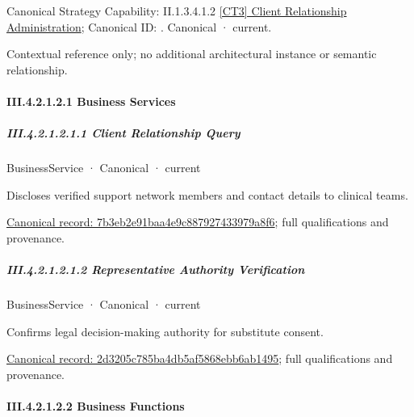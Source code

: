 {\small Canonical Strategy Capability: II.1.3.4.1.2 \hyperref[element:d682c11d3eb04770b1f20be478fd475e]{[CT3] Client Relationship Administration}; Canonical ID: \texttt{}. Canonical · current.}\par
Contextual reference only; no additional architectural instance or semantic relationship.\par
\paragraph*{III.4.2.1.2.1 Business Services}
\label{navigation:III.4.2.1.2.1}

\subparagraph*{III.4.2.1.2.1.1 Client Relationship Query}
\label{navigation:III.4.2.1.2.1.1}

\label{element:7b3eb2e91baa4e9c887927433979a8f6}
{\small BusinessService · Canonical · current}\par

Discloses verified support network members and contact details to clinical teams.


{\footnotesize \href{../../../../continuum/business/business-service/7b3eb2e91baa4e9c887927433979a8f6.md}{Canonical record: 7b3eb2e91baa4e9c887927433979a8f6}; full qualifications and provenance.}\par
\subparagraph*{III.4.2.1.2.1.2 Representative Authority Verification}
\label{navigation:III.4.2.1.2.1.2}

\label{element:2d3205c785ba4db5af5868ebb6ab1495}
{\small BusinessService · Canonical · current}\par

Confirms legal decision-making authority for substitute consent.


{\footnotesize \href{../../../../continuum/business/business-service/2d3205c785ba4db5af5868ebb6ab1495.md}{Canonical record: 2d3205c785ba4db5af5868ebb6ab1495}; full qualifications and provenance.}\par
\paragraph*{III.4.2.1.2.2 Business Functions}
\label{navigation:III.4.2.1.2.2}

